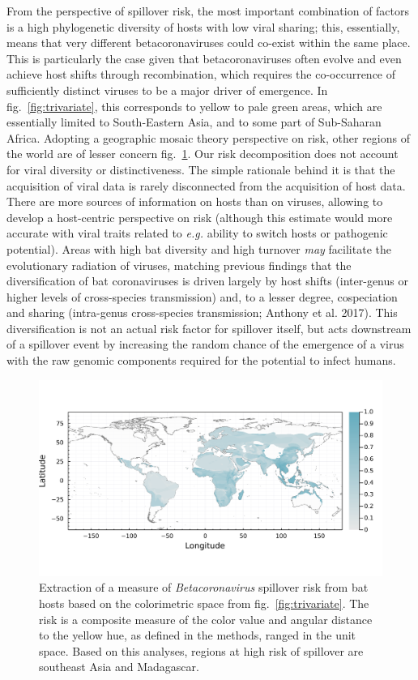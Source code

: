 \documentclass[11pt]{article}
\makeatletter
\def\maxwidth{\ifdim\Gin@nat@width>\linewidth\linewidth
\else\Gin@nat@width\fi}
\let\Oldincludegraphics\includegraphics
\renewcommand{\includegraphics}[1]{\Oldincludegraphics[width=\maxwidth]{#1}}
\makeatother
\begin{document}
From the perspective of spillover risk, the most important combination
of factors is a high phylogenetic diversity of hosts with low viral
sharing; this, essentially, means that very different betacoronaviruses
could co-exist within the same place. This is particularly the case
given that betacoronaviruses often evolve and even achieve host shifts
through recombination, which requires the co-occurrence of sufficiently
distinct viruses to be a major driver of emergence. In
fig.~\ref{fig:trivariate}, this corresponds to yellow to pale green
areas, which are essentially limited to South-Eastern Asia, and to some
part of Sub-Saharan Africa. Adopting a geographic mosaic theory
perspective on risk, other regions of the world are of lesser concern
fig.~\ref{fig:risk}. Our risk decomposition does not account for viral
diversity or distinctiveness. The simple rationale behind it is that the
acquisition of viral data is rarely disconnected from the acquisition of
host data. There are more sources of information on hosts than on
viruses, allowing to develop a host-centric perspective on risk
(although this estimate would more accurate with viral traits related to
\emph{e.g.} ability to switch hosts or pathogenic potential). Areas with
high bat diversity and high turnover \emph{may} facilitate the
evolutionary radiation of viruses, matching previous findings that the
diversification of bat coronaviruses is driven largely by host shifts
(inter-genus or higher levels of cross-species transmission) and, to a
lesser degree, cospeciation and sharing (intra-genus cross-species
transmission; Anthony et al. 2017). This diversification is not an
actual risk factor for spillover itself, but acts downstream of a
spillover event by increasing the random chance of the emergence of a
virus with the raw genomic components required for the potential to
infect humans.

\begin{figure}
\hypertarget{fig:risk}{%
\centering
\includegraphics{figures/risk_map.png}
\caption{Extraction of a measure of \emph{Betacoronavirus} spillover
risk from bat hosts based on the colorimetric space from
fig.~\ref{fig:trivariate}. The risk is a composite measure of the color
value and angular distance to the yellow hue, as defined in the methods,
ranged in the unit space. Based on this analyses, regions at high risk
of spillover are southeast Asia and Madagascar.}\label{fig:risk}
}
\end{figure}
\end{document}
